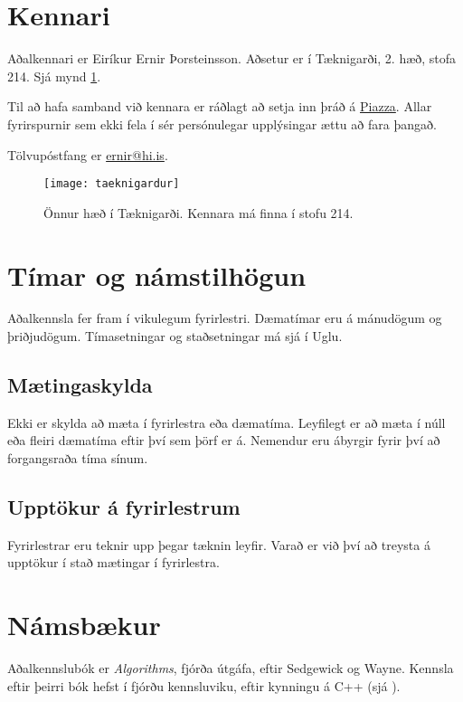 \documentclass{article}
\begin{document}
\section{Kennari}
Aðalkennari er Eiríkur Ernir Þorsteinsson. Aðsetur er í Tæknigarði, 2. hæð, stofa 214. Sjá mynd \ref{fig:taeknigardur}.

Til að hafa samband við kennara er ráðlagt að setja inn þráð á \href{https://piazza.com/hi.is/spring2018/tl203g}{Piazza}. Allar fyrirspurnir sem ekki fela í sér persónulegar upplýsingar ættu að fara þangað.

Tölvupóstfang er \href{mailto:ernir@hi.is}{ernir@hi.is}.

\begin{figure}
	\caption{Önnur hæð í Tæknigarði. Kennara má finna í stofu 214.}
	\label{fig:taeknigardur}
	\begin{center}
		\texttt{[image: taeknigardur]}
	\end{center}
\end{figure}

\section{Tímar og námstilhögun}
Aðalkennsla fer fram í vikulegum fyrirlestri. Dæmatímar eru á mánudögum og þriðjudögum. Tímasetningar og staðsetningar má sjá í Uglu.

\subsection{Mætingaskylda}
Ekki er skylda að mæta í fyrirlestra eða dæmatíma. Leyfilegt er að mæta í núll eða fleiri dæmatíma eftir því sem þörf er á. Nemendur eru ábyrgir fyrir því að forgangsraða tíma sínum.

\subsection{Upptökur á fyrirlestrum}
Fyrirlestrar eru teknir upp þegar tæknin leyfir. Varað er við því að treysta á upptökur í stað mætingar í fyrirlestra.

\section{Námsbækur}
Aðalkennslubók er \emph{Algorithms}, fjórða útgáfa, eftir Sedgewick og Wayne. Kennsla eftir þeirri bók hefst í fjórðu kennsluviku, eftir kynningu á C++ (sjá ).
\end{document}
